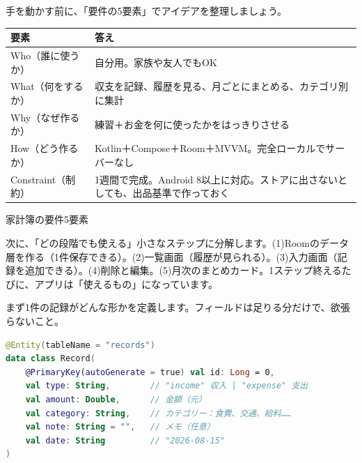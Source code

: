 


手を動かす前に、「要件の5要素」でアイデアを整理しましょう。

\begin{center}
\begin{tabularx}{\linewidth}{|X|X|}
\hline
\textbf{要素} & \textbf{答え} \tabularnewline
\hline
Who（誰に使うか） & 自分用。家族や友人でもOK \tabularnewline
What（何をするか） & 収支を記録、履歴を見る、月ごとにまとめる、カテゴリ別に集計 \tabularnewline
Why（なぜ作るか） & 練習＋お金を何に使ったかをはっきりさせる \tabularnewline
How（どう作るか） & Kotlin＋Compose＋Room＋MVVM。完全ローカルでサーバーなし \tabularnewline
Constraint（制約） & 1週間で完成。Android 8以上に対応。ストアに出さないとしても、出品基準で作っておく \tabularnewline
\hline
\end{tabularx}
\end{center}

\begin{center}\small\color{gray}家計簿の要件5要素\end{center}

次に、「どの段階でも使える」小さなステップに分解します。(1)Roomのデータ層を作る（1件保存できる）。(2)一覧画面（履歴が見られる）。(3)入力画面（記録を追加できる）。(4)削除と編集。(5)月次のまとめカード。1ステップ終えるたびに、アプリは「使えるもの」になっています。


まず1件の記録がどんな形かを定義します。フィールドは足りる分だけで、欲張らないこと。

\begin{lstlisting}[language=Kotlin]
@Entity(tableName = "records")
data class Record(
    @PrimaryKey(autoGenerate = true) val id: Long = 0,
    val type: String,        // "income" 収入 | "expense" 支出
    val amount: Double,      // 金額（元）
    val category: String,    // カテゴリー：食費、交通、給料……
    val note: String = "",   // メモ（任意）
    val date: String         // "2026-08-15"
)
\end{lstlisting}

